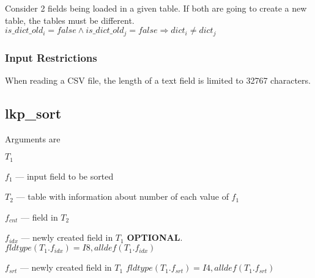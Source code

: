 \documentclass{report}
\begin{document}
\begin{invariant}
Consider 2 fields being loaded in a given table. If both are going to
create a new table, the tables must be different. 
\(is\_dict\_old_i = false \wedge is\_dict\_old_j = false \Rightarrow dict_i
\neq dict_j\)
\end{invariant}

\subsubsection{Input Restrictions}
\label{Input_Restrictions}

\be
\item 
When reading a CSV file, the length of a text field is limited to 32767
characters.
\ee

% 
\subsection{lkp\_sort}
\label{lkp_sort}

Arguments are 
\be
\item \(T_1\)
\item \(f_1\) --- input field to be sorted
\item \(T_2\) --- table with information about number of each value of
\(f_1\)
\item \(f_{cnt}\) --- field in \(T_2\)
\item \(f_{idx}\) --- newly created field in \(T_1\) {\bf OPTIONAL}.
\(fldtype(T_1.f_{idx}) = I8, alldef(T_1.f_{idx})\)
\item \(f_{srt}\) --- newly created field in \(T_1\)
\(fldtype(T_1.f_{srt}) = I4, alldef(T_1.f_{srt})\)
\ee
\end{document}
